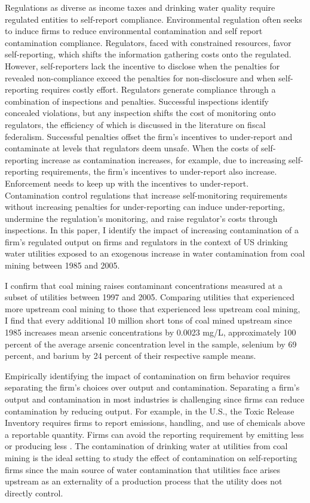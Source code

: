 \documentclass[12pt]{article}
\begin{document}
Regulations as diverse as income taxes and drinking water quality require regulated entities to self-report compliance. Environmental regulation often seeks to induce firms to reduce environmental contamination and self report contamination compliance. Regulators, faced with constrained resources, favor self-reporting, which shifts the information gathering costs onto the regulated. However, self-reporters lack the incentive to disclose when the penalties for revealed non-compliance exceed the penalties for non-disclosure and when self-reporting requires costly effort. Regulators generate compliance through a combination of inspections and penalties. Successful inspections identify concealed violations, but any inspection shifts the cost of monitoring onto regulators, the efficiency of which is discussed in the literature on fiscal federalism. Successful penalties offset the firm's incentives to under-report and contaminate at levels that regulators deem unsafe. When the costs of self-reporting increase as contamination increases, for example, due to increasing self-reporting requirements, the firm's incentives to under-report also increase. Enforcement needs to keep up with the incentives to under-report. Contamination control regulations that increase self-monitoring requirements without increasing penalties for under-reporting can induce under-reporting, undermine the regulation's monitoring, and raise regulator's costs through inspections. In this paper, I identify the impact of increasing contamination of a firm's regulated output on firms and regulators in the context of US drinking water utilities exposed to an exogenous increase in water contamination from coal mining between 1985 and 2005. 

I confirm that coal mining raises contaminant concentrations measured at a subset of utilities between 1997 and 2005. Comparing utilities that experienced more upstream coal mining to those that experienced less upstream coal mining, I find that every additional 10 million short tons of coal mined upstream since 1985 increases mean arsenic concentrations by 0.0023 mg/L, approximately 100 percent of the average arsenic concentration level in the sample, selenium by 69 percent, and barium by 24 percent of their respective sample means.

Empirically identifying the impact of contamination on firm behavior requires separating the firm's choices over output and contamination. Separating a firm's output and contamination in most industries is challenging since firms can reduce contamination by reducing output. For example, in the U.S., the Toxic Release Inventory requires firms to report emissions, handling, and use of chemicals above a reportable quantity. Firms can avoid the reporting requirement by emitting less or producing less \parencite{zou2021unwatched, 10.1162/rest_a_01477}. The contamination of drinking water at utilities from coal mining is the ideal setting to study the effect of contamination on self-reporting firms since the main source of water contamination that utilities face arises upstream as an externality of a production process that the utility does not directly control.
\end{document}
